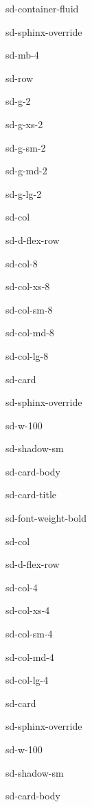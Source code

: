 \documentclass[letterpaper,10pt,italian]{jupyterBook}
\begin{document}
\begin{sphinxuseclass}{sd-container-fluid}
\begin{sphinxuseclass}{sd-sphinx-override}
\begin{sphinxuseclass}{sd-mb-4}
\begin{sphinxuseclass}{sd-row}
\begin{sphinxuseclass}{sd-g-2}
\begin{sphinxuseclass}{sd-g-xs-2}
\begin{sphinxuseclass}{sd-g-sm-2}
\begin{sphinxuseclass}{sd-g-md-2}
\begin{sphinxuseclass}{sd-g-lg-2}
\begin{sphinxuseclass}{sd-col}
\begin{sphinxuseclass}{sd-d-flex-row}
\begin{sphinxuseclass}{sd-col-8}
\begin{sphinxuseclass}{sd-col-xs-8}
\begin{sphinxuseclass}{sd-col-sm-8}
\begin{sphinxuseclass}{sd-col-md-8}
\begin{sphinxuseclass}{sd-col-lg-8}
\begin{sphinxuseclass}{sd-card}
\begin{sphinxuseclass}{sd-sphinx-override}
\begin{sphinxuseclass}{sd-w-100}
\begin{sphinxuseclass}{sd-shadow-sm}
\begin{sphinxuseclass}{sd-card-body}
\begin{sphinxuseclass}{sd-card-title}
\begin{sphinxuseclass}{sd-font-weight-bold}
\end{sphinxuseclass}
\end{sphinxuseclass}
\end{sphinxuseclass}
\end{sphinxuseclass}
\end{sphinxuseclass}
\end{sphinxuseclass}
\end{sphinxuseclass}
\end{sphinxuseclass}
\end{sphinxuseclass}
\end{sphinxuseclass}
\end{sphinxuseclass}
\end{sphinxuseclass}
\end{sphinxuseclass}
\end{sphinxuseclass}
\begin{sphinxuseclass}{sd-col}
\begin{sphinxuseclass}{sd-d-flex-row}
\begin{sphinxuseclass}{sd-col-4}
\begin{sphinxuseclass}{sd-col-xs-4}
\begin{sphinxuseclass}{sd-col-sm-4}
\begin{sphinxuseclass}{sd-col-md-4}
\begin{sphinxuseclass}{sd-col-lg-4}
\begin{sphinxuseclass}{sd-card}
\begin{sphinxuseclass}{sd-sphinx-override}
\begin{sphinxuseclass}{sd-w-100}
\begin{sphinxuseclass}{sd-shadow-sm}
\begin{sphinxuseclass}{sd-card-body}





\end{sphinxuseclass}
\end{sphinxuseclass}
\end{sphinxuseclass}
\end{sphinxuseclass}
\end{sphinxuseclass}
\end{sphinxuseclass}
\end{sphinxuseclass}
\end{sphinxuseclass}
\end{sphinxuseclass}
\end{sphinxuseclass}
\end{sphinxuseclass}
\end{sphinxuseclass}
\end{sphinxuseclass}
\end{sphinxuseclass}
\end{sphinxuseclass}
\end{sphinxuseclass}
\end{sphinxuseclass}
\end{sphinxuseclass}
\end{sphinxuseclass}
\end{sphinxuseclass}
\end{sphinxuseclass}
\end{document}
